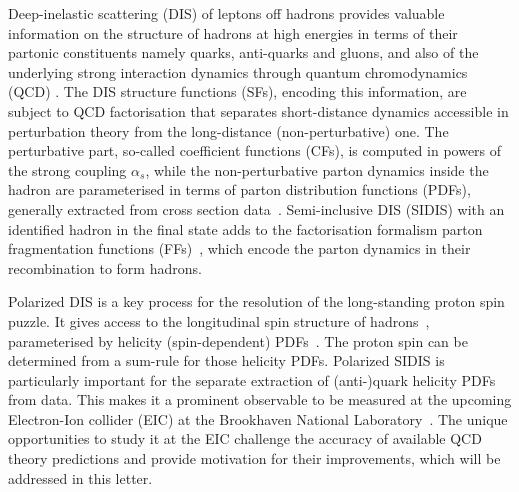 \documentclass[%
 twocolumn,
 superscriptaddress,
 preprintnumbers,
 nofootinbib,
 amsmath,amssymb,
 aps,
 prl,
]{revtex4}
\begin{document}
% 
Deep-inelastic scattering (DIS) of leptons off hadrons provides
valuable information on the structure 
of hadrons at high energies in terms of their partonic constituents namely quarks, 
anti-quarks and gluons, and also of the underlying strong interaction dynamics through quantum chromodynamics (QCD) \cite{Blumlein:2012bf}. 
The DIS structure functions (SFs), encoding this information, are subject to QCD factorisation that separates short-distance dynamics accessible in perturbation theory
from the long-distance (non-perturbative) one. 
The perturbative part, so-called coefficient functions (CFs), is 
computed in powers of the strong coupling $\alpha_s$, 
while the non-perturbative parton dynamics inside the hadron 
are parameterised in terms of parton distribution functions (PDFs), 
generally extracted from cross section data~\cite{Workman:2022ynf}.
Semi-inclusive DIS (SIDIS) with an identified hadron in the final state adds to the factorisation formalism parton fragmentation functions (FFs)~\cite{Metz:2016swz},
which encode the parton dynamics in their recombination to
form hadrons.

Polarized DIS is a key process for the resolution of the long-standing proton spin puzzle. It gives access to the longitudinal spin structure of hadrons~\cite{Aidala:2012mv}, parameterised by helicity (spin-dependent) PDFs~\cite{deFlorian:2009vb,deFlorian:2014yva,Nocera:2014gqa}. 
The proton spin can be determined from a sum-rule for those helicity PDFs. 
Polarized SIDIS is particularly important for the separate extraction of (anti-)quark helicity PDFs from data. 
This makes it a prominent observable to be measured at the upcoming Electron-Ion collider (EIC) at the Brookhaven National Laboratory~\cite{AbdulKhalek:2021gbh}.
The unique opportunities to study it at the EIC challenge the accuracy of available QCD theory predictions and provide motivation for their improvements, which will be addressed in this letter.
\end{document}
